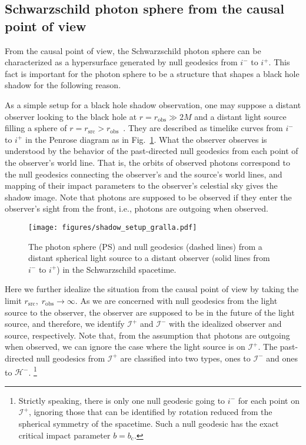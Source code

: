 \documentclass[prd,showpacs,preprintnumbers,groupedaddress,superscriptaddress,nofootinbib,11pt]{revtex4-1} %
\theoremstyle{newplain}
\newcommand{\mr}[1]{\mathrm{#1}}
\begin{document}
\subsection{Schwarzschild photon sphere from the causal point of view}
From the causal point of view, the Schwarzschild photon sphere can be characterized as a hypersurface generated by null geodesics from $i^-$ to $i^+$.
This fact is important for the photon sphere to be a structure that shapes a black hole shadow for the following reason.
\par
As a simple setup for a black hole shadow observation, one may suppose a distant observer looking to the black hole at $r=r_{\mr{obs}}\gg2M$ and a distant light source filling a sphere of $r=r_{\mr{src}}>r_{\mr{obs}}$~\cite{Cunha:2018acu, Gralla_2019, Okabayashi_2020}.
They are described as timelike curves from $i^-$ to $i^+$ in the Penrose diagram as in Fig.~\ref{fig:shadow-setup-gralla}.
What the observer observes is understood by the behavior of the past-directed null geodesics from each point of the observer's world line.
That is, the orbits of observed photons correspond to the null geodesics connecting the observer's and the source's world lines, and mapping of their impact parameters to the observer's celestial sky gives the shadow image.
Note that photons are supposed to be observed if they enter the observer's sight from the front, i.e., photons are outgoing when observed.
\begin{figure}[t]
\texttt{[image: figures/shadow\_setup\_gralla.pdf]}
\caption{\label{fig:shadow-setup-gralla}
The photon sphere (PS) and null geodesics (dashed lines) from a distant spherical light source to a distant observer (solid lines from $i^-$ to $i^+$) in the Schwarzschild spacetime.
}
\end{figure}
\par
Here we further idealize the situation from the causal point of view by taking the limit $r_{\mr{src}},\;r_{\mr{obs}}\to \infty$.
As we are concerned with null geodesics from the light source to the observer, the observer are supposed to be in the future of the light source, and therefore, we identify $\mathscr{I}^+$ and $\mathscr{I}^-$ with the idealized observer and source, respectively.
Note that, from the assumption that photons are outgoing when observed, we can ignore the case where the light source is on $\mathscr{I}^+$.
The past-directed null geodesics from $\mathscr{I}^+$ are classified into two types, ones to $\mathscr{I}^-$ and ones to $\mathscr{H}^-$.
\footnote{
Strictly speaking, there is only one null geodesic going to $i^-$ for each point on $\mathscr{I}^+$, ignoring those that can be identified by rotation reduced from the spherical symmetry of the spacetime.
Such a null geodesic has the exact critical impact parameter $b=b_\text{c}$.
}
\end{document}

